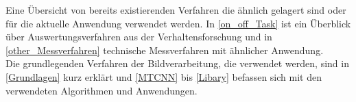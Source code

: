 Eine Übersicht von bereits existierenden Verfahren die ähnlich gelagert sind oder für die aktuelle Anwendung verwendet werden. In \autoref{on_off_Task} ist ein Überblick über Auswertungsverfahren aus der Verhaltensforschung und in \autoref{other_Messverfahren} technische Messverfahren mit ähnlicher Anwendung.\\
Die grundlegenden Verfahren der Bildverarbeitung, die verwendet werden, sind in \autoref{Grundlagen} kurz erklärt und \autoref{MTCNN} bis \autoref{Libary} befassen sich mit den verwendeten Algorithmen und Anwendungen.